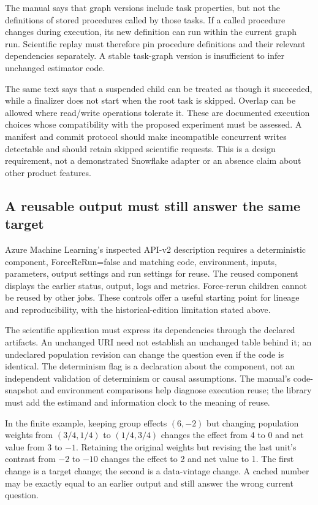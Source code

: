 The manual says that graph versions include task properties, but not the
definitions of stored procedures called by those tasks. If a called procedure
changes during execution, its new definition can run within the current graph
run. Scientific replay must therefore pin procedure definitions and their
relevant dependencies separately. A stable task-graph version is insufficient
to infer unchanged estimator code.
\citep{exec22_workflow_snowflake_graphs}

The same text says that a suspended child can be treated as though it
succeeded, while a finalizer does not start when the root task is skipped.
Overlap can be allowed where read/write operations tolerate it. These are
documented execution choices whose compatibility with the proposed experiment
must be assessed. A manifest and commit protocol should make incompatible
concurrent writes detectable and should retain skipped scientific requests.
This is a design requirement, not a demonstrated Snowflake adapter or an
absence claim about other product features.
\citep{exec22_workflow_snowflake_graphs}

\subsection{A reusable output must still answer the same target}

Azure Machine Learning's inspected API-v2 description requires a deterministic
component, ForceReRun=false and matching code, environment, inputs, parameters,
output settings and run settings for reuse. The reused component displays the
earlier status, output, logs and metrics. Force-rerun children cannot be reused
by other jobs. These controls offer a useful starting point for lineage and
reproducibility, with the historical-edition limitation stated above.
\citep{exec22_workflow_azure_reuse}

The scientific application must express its dependencies through the declared
artifacts. An unchanged URI need not establish an unchanged table behind it;
an undeclared population revision can change the question even if the code
is identical. The determinism flag is a declaration about the component, not
an independent validation of determinism or causal assumptions. The manual's
code-snapshot and environment comparisons help diagnose execution reuse; the
library must add the estimand and information clock to the meaning of reuse.
\citep{exec22_workflow_azure_reuse}

In the finite example, keeping group effects $(6,-2)$ but changing population
weights from $(3/4,1/4)$ to $(1/4,3/4)$ changes the effect from 4 to 0 and net
value from 3 to $-1$. Retaining the original weights but revising the last
unit's contrast from $-2$ to $-10$ changes the effect to 2 and net value to 1.
The first change is a target change; the second is a data-vintage change.
A cached number may be exactly equal to an earlier output and still answer
the wrong current question.~\citep{exec22_workflow_reference}

